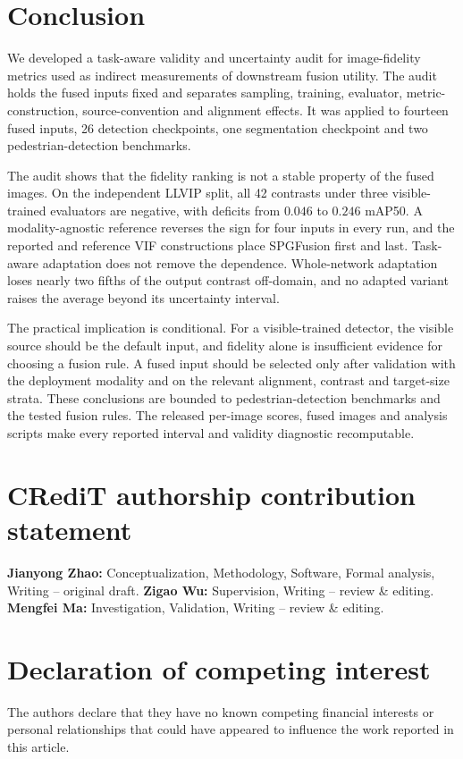 \documentclass[journal]{IEEEtran}
\begin{document}
\section{Conclusion}
\label{sec:conclusion}

\begin{sloppypar}
We developed a task-aware validity and uncertainty audit for image-fidelity metrics used
as indirect measurements of downstream fusion utility. The audit holds the fused inputs
fixed and separates sampling, training, evaluator, metric-construction, source-convention
and alignment effects. It was applied to fourteen fused inputs, 26 detection checkpoints,
one segmentation checkpoint and two pedestrian-detection benchmarks.

The audit shows that the fidelity ranking is not a stable property of the fused images.
On the independent LLVIP split, all 42 contrasts under three visible-trained evaluators
are negative, with deficits from $0.046$ to $0.246$ mAP50. A modality-agnostic reference
reverses the sign for four inputs in every run, and the reported and reference VIF
constructions place SPGFusion first and last. Task-aware adaptation does not remove the
dependence. Whole-network adaptation loses nearly two fifths of the output contrast
off-domain, and no adapted variant raises the average beyond its uncertainty interval.

The practical implication is conditional. For a visible-trained detector, the visible
source should be the default input, and fidelity alone is insufficient evidence for
choosing a fusion rule. A fused input should be selected only after validation with the
deployment modality and on the relevant alignment, contrast and target-size strata.
These conclusions are bounded to pedestrian-detection benchmarks and the tested fusion
rules. The released per-image scores, fused images and analysis scripts make every
reported interval and validity diagnostic recomputable.
\end{sloppypar}

\section*{CRediT authorship contribution statement}
\textbf{Jianyong Zhao:} Conceptualization, Methodology, Software, Formal analysis,
Writing -- original draft. \textbf{Zigao Wu:} Supervision, Writing -- review \&
editing. \textbf{Mengfei Ma:} Investigation, Validation, Writing -- review \&
editing.

\section*{Declaration of competing interest}
The authors declare that they have no known competing financial interests or
personal relationships that could have appeared to influence the work reported in
this article.
\end{document}
